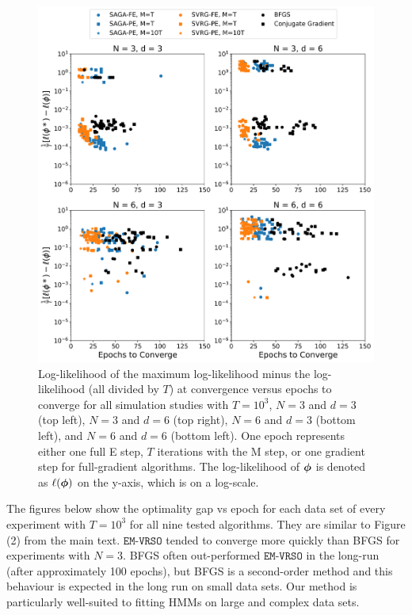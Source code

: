 \documentclass[12pt]{article}
\begin{document}
\begin{figure}[H]
    \centering
    \includegraphics[width=6.5in]{../plt/scatter_sim_T_1000.png}
    \caption{Log-likelihood of the maximum log-likelihood minus the log-likelihood (all divided by $T$) at convergence versus epochs to converge for all simulation studies with $T=10^{3}$, $N=3$ and $d=3$ (top left), $N=3$ and $d=6$ (top right), $N=6$ and $d=3$ (bottom left), and $N=6$ and $d=6$ (bottom left). One epoch represents either one full E step, $T$ iterations with the M step, or one gradient step for full-gradient algorithms. The log-likelihood of $\boldsymbol{\phi}$ is denoted as $\ell(\boldsymbol{\phi})$ on the y-axis, which is on a log-scale.}
    \label{fig:scatter_sim}
\end{figure}


\newpage 

The figures below show the optimality gap vs epoch for each data set of every experiment with $T=10^{3}$ for all nine tested algorithms. They are similar to Figure (2) from the main text. $\texttt{EM-VRSO}$ tended to converge more quickly than BFGS for experiments with $N=3$. BFGS often out-performed $\texttt{EM-VRSO}$ in the long-run (after approximately 100 epochs), but BFGS is a second-order method and this behaviour is expected in the long run on small data sets. Our method is particularly well-suited to fitting HMMs on large and complex data sets. 
\end{document}

